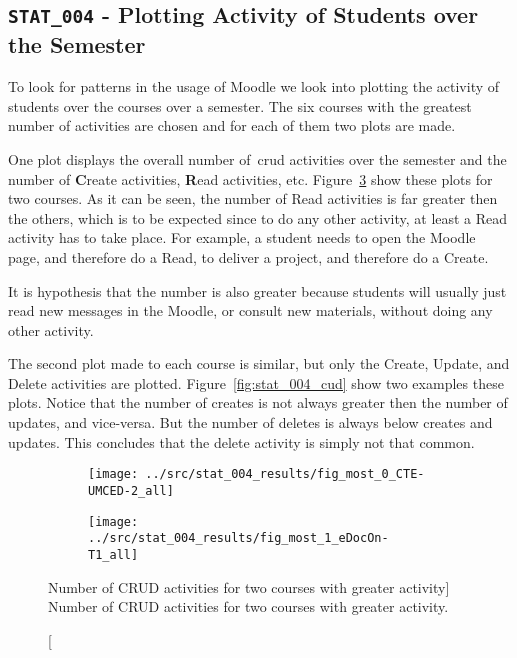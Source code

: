 \subsection{\texttt{STAT\_004} - Plotting Activity of Students over the
Semester}

To look for patterns in the usage of Moodle we look into plotting the activity
of students over the courses over a semester. The six courses with the greatest
number of activities are chosen and for each of them two plots are made.

One plot displays the overall number of~\gls{crud} activities over the semester
and the number of \textbf{C}reate activities, \textbf{R}ead activities, etc.
Figure~\ref{fig:stat_004_all} show these plots for two courses. As it can be
seen, the number of Read activities is far greater then the others, which is to
be expected since to do any other activity, at least a Read activity has to
take place. For example, a student needs to open the Moodle page, and therefore
do a Read, to deliver a project, and therefore do a Create.

It is hypothesis that the number is also greater because students will usually
just read new messages in the Moodle, or consult new materials, without doing
any other activity.

The second plot made to each course is similar, but only the Create, Update,
and Delete activities are plotted. Figure~\ref{fig:stat_004_cud} show two
examples these plots. Notice that the number of creates is not always greater
then the number of updates, and vice-versa. But the number of deletes is always
below creates and updates. This concludes that the delete activity is simply
not that common.

\begin{figure}[h!]
    \centering

    \begin{subfigure}{.5\textwidth}
        \centering
        \texttt{[image: ../src/stat\_004\_results/fig\_most\_0\_CTE-UMCED-2\_all]}
        \label{subfig:stat_004_0_all}
    \end{subfigure}%
    \begin{subfigure}{.5\textwidth}
        \centering
        \texttt{[image: ../src/stat\_004\_results/fig\_most\_1\_eDocOn-T1\_all]}
        \label{subfig:stat_004_3_all}
    \end{subfigure}

    \caption
        [Number of CRUD activities for two courses with greater activity]
        {Number of CRUD activities for two courses with greater activity.}

    \label{fig:stat_004_all}
\end{figure}

